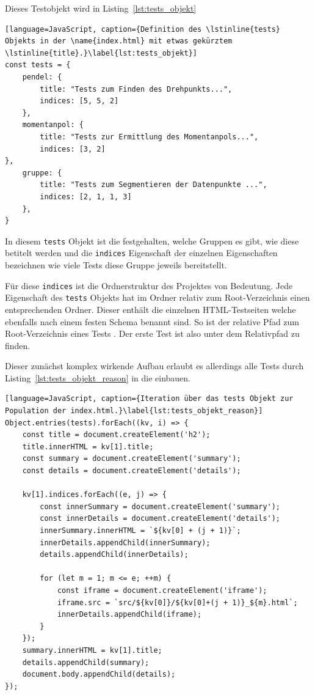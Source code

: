 Dieses Testobjekt wird in Listing~\ref{lst:tests_objekt}

\begin{lstlisting}[language=JavaScript, caption={Definition des \lstinline{tests} Objekts in der \name{index.html} mit etwas gekürztem \lstinline{title}.}\label{lst:tests_objekt}]
const tests = {
    pendel: {
        title: "Tests zum Finden des Drehpunkts...",
        indices: [5, 5, 2]
    },
    momentanpol: {
        title: "Tests zur Ermittlung des Momentanpols...",
        indices: [3, 2]
},
    gruppe: {
        title: "Tests zum Segmentieren der Datenpunkte ...",
        indices: [2, 1, 1, 3]
    },
}
\end{lstlisting}

In diesem \lstinline{tests} Objekt ist die festgehalten, welche Gruppen es gibt, wie diese betitelt werden und die \lstinline{indices} Eigenschaft der einzelnen Eigenschaften bezeichnen wie viele Tests diese Gruppe jeweils bereitstellt.

Für diese \lstinline{indices} ist die Ordnerstruktur des Projektes von Bedeutung.
Jede Eigenschaft des \lstinline{tests} Objekts hat im  Ordner relativ zum Root-Verzeichnis einen entsprechenden Ordner.
Dieser enthält die einzelnen HTML-Testseiten welche ebenfalls nach einem festen Schema benannt sind.
So ist der relative Pfad zum Root-Verzeichnis eines Tests .
Der erste Test ist also unter dem Relativpfad  zu finden.

Dieser zunächst komplex wirkende Aufbau erlaubt es allerdings alle Tests durch Listing~\ref{lst:tests_objekt_reason} in die  einbauen.

\begin{lstlisting}[language=JavaScript, caption={Iteration über das tests Objekt zur Population der index.html.}\label{lst:tests_objekt_reason}]
Object.entries(tests).forEach((kv, i) => {
    const title = document.createElement('h2');
    title.innerHTML = kv[1].title;
    const summary = document.createElement('summary');
    const details = document.createElement('details');

    kv[1].indices.forEach((e, j) => {
        const innerSummary = document.createElement('summary');
        const innerDetails = document.createElement('details');
        innerSummary.innerHTML = `${kv[0] + (j + 1)}`;
        innerDetails.appendChild(innerSummary);
        details.appendChild(innerDetails);

        for (let m = 1; m <= e; ++m) {
            const iframe = document.createElement('iframe');
            iframe.src = `src/${kv[0]}/${kv[0]+(j + 1)}_${m}.html`;
            innerDetails.appendChild(iframe);
        }
    });
    summary.innerHTML = kv[1].title;
    details.appendChild(summary);
    document.body.appendChild(details);
});
\end{lstlisting}

